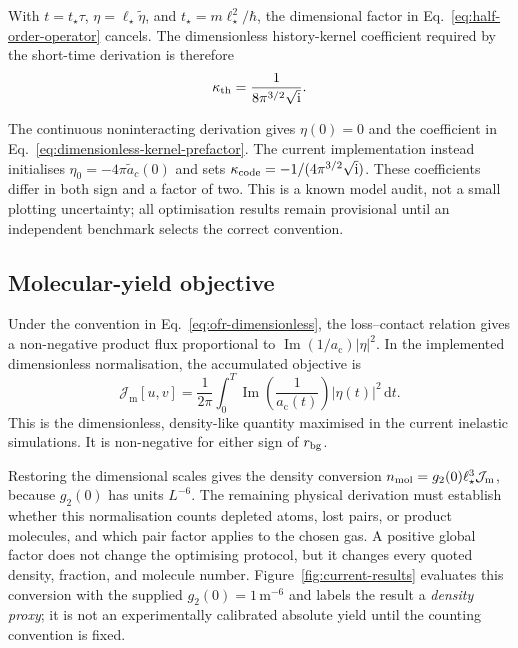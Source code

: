 \documentclass[9pt,a4paper,twocolumn,twoside]{rho-class/rho}
\newcommand{\ac}{a_{\mathrm{c}}}
\newcommand{\Jmol}{\mathcal{J}_{\mathrm{m}}}
\newcommand{\dd}{\mathrm{d}}
\newcommand{\ii}{\mathrm{i}}
\begin{document}
        With $t=t_\star\tau$, $\eta=\ell_\star\widetilde\eta$, and $t_\star=m\ell_\star^2/\hbar$, the dimensional factor in Eq.~\eqref{eq:half-order-operator} cancels. The dimensionless history-kernel coefficient required by the short-time derivation is therefore
        \begin{equation}\label{eq:dimensionless-kernel-prefactor}
            \kappa_{\rm th}=\frac{1}{8\pi^{3/2}\sqrt{\ii}}.
        \end{equation}

        \begin{rhoenv}[frametitle=Unresolved solver convention]
            The continuous noninteracting derivation gives $\eta(0)=0$ and the
            coefficient in Eq.~\eqref{eq:dimensionless-kernel-prefactor}. The
            current implementation instead initialises
            $\eta_0=-4\pi\widetilde a_c(0)$ and sets
            $\kappa_{\rm code}=-1/(4\pi^{3/2}\sqrt{\ii})$. These coefficients
            differ in both sign and a factor of two. This is a known model audit,
            not a small plotting uncertainty; all optimisation results remain
            provisional until an independent benchmark selects the correct
            convention.
        \end{rhoenv}

    \subsection{Molecular-yield objective}

        Under the convention in Eq.~\eqref{eq:ofr-dimensionless}, the loss--contact relation gives a non-negative product flux proportional to $\operatorname{Im}(1/\ac)|\eta|^2$. In the implemented dimensionless normalisation, the accumulated objective is
        \begin{equation}\label{eq:molecule-objective}
            \Jmol[u,v]
            =\frac{1}{2\pi}\int_0^T
            \operatorname{Im}\!\left(\frac{1}{\ac(t)}\right)
            |\eta(t)|^2\,\dd t.
        \end{equation}
        This is the dimensionless, density-like quantity maximised in the current inelastic simulations. It is non-negative for either sign of $r_{\rm bg}$.

        \begin{rhoenv}[frametitle=Counting convention to resolve]
            Restoring the dimensional scales gives the density conversion
            $n_{\rm mol}=g_2(0)\ell_\star^3\Jmol$, because
            $g_2(0)$ has units $L^{-6}$. The remaining physical derivation must
            establish whether this normalisation counts depleted atoms, lost
            pairs, or product molecules, and which pair factor applies to the
            chosen gas. A positive global factor does not change the optimising
            protocol, but it changes every quoted density, fraction, and
            molecule number. Figure~\ref{fig:current-results} evaluates this
            conversion with the supplied $g_2(0)=1\,\mathrm{m}^{-6}$ and labels
            the result a \emph{density proxy}; it is not an experimentally
            calibrated absolute yield until the counting convention is fixed.
        \end{rhoenv}
\end{document}
